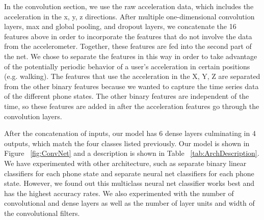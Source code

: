 In the convolution section, we use the raw acceleration data, which includes the acceleration in the x, y, z directions. 
After multiple one-dimensional convolution layers, max and global pooling, and dropout layers, 
we concatenate the 16 features above in order to incorporate the features that do not involve the data from the accelerometer.  
Together, these features are fed into the second part of the net.  
We chose to separate the features in this way in order to take advantage of the potentially periodic behavior of a user's acceleration in certain positions (e.g. walking).
The features that use the acceleration in the X, Y, Z are separated from the other binary features because we wanted to capture the time series data of the different phone states.
The other binary features are independent of the time, so these features are added in after the acceleration features go through the convolution layers.  

After the concatenation of inputs, our model has 6 dense layers culminating in 4 outputs, which match the four classes listed previously. 
Our model is shown in Figure ~\ref{fig:ConvNet} and a description is shown in Table ~\ref{tab:ArchDescription}.
We have experimented with other architecture, such as separate binary linear classifiers for each phone state and separate neural net classifiers for each phone state.
However, we found out this multiclass neural net classifier works best and has the highest accuracy rates. 
We also experimented with the number of convolutional and dense layers as well as the number of layer units and width of the convolutional filters.

